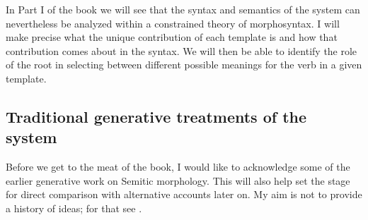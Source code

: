 In Part I of the book we will see that the syntax and semantics of the system can nevertheless be analyzed within a constrained theory of morphosyntax. I will make precise what the unique contribution of each template is and how that contribution comes about in the syntax. We will then be able to identify the role of the root in selecting between different possible meanings for the verb in a given template.


	\subsection{Traditional generative treatments of the system} \label{intro:basic:jjmcc}
Before we get to the meat of the book, I would like to acknowledge some of the earlier generative work on Semitic morphology. This will also help set the stage for direct comparison with alternative accounts later on. My aim is not to provide a history of ideas; for that see \cite{kastnertucker19cup}.

